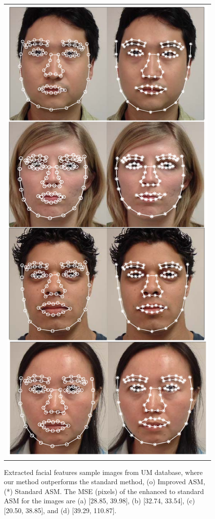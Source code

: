 \begin{figure}[tbp]
\begin{center}
\begin{tabular}{c}
\includegraphics[scale = 0.8]{./chapters/figures/all_pics_1.eps}
\end{tabular}
\caption{Extracted facial features sample images from UM database,
where our method outperforms the standard method, (o) Improved ASM,
(*) Standard ASM. The MSE (pixels) of the enhanced to standard ASM
for the images are (a) [28.85, 39.98], (b) [32.74, 33.54], (c)
[20.50, 38.85], and (d) [39.29, 110.87].} \label{fig:ASM_results}
\end{center}
\end{figure}
